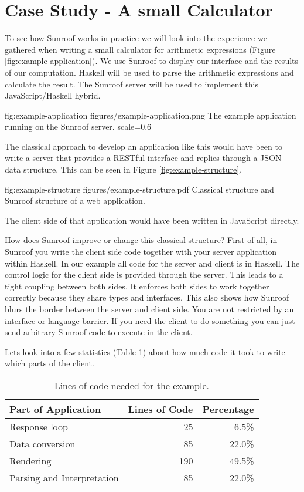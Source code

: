  
\section{Case Study - A small Calculator}
\label{sec:extended-example}

To see how Sunroof works in practice we will look into the 
experience we gathered when writing a small calculator
for arithmetic expressions (Figure \ref{fig:example-application}). 
We use Sunroof to display our interface
and the results of our computation. Haskell will be used to parse the 
arithmetic expressions and calculate the result. The Sunroof server 
will be used to implement this JavaScript/Haskell hybrid.

\FigureS%
{fig:example-application}%
{figures/example-application.png}%
{The example application running on the Sunroof server.}%
{scale=0.6}

The classical approach to develop an application like this would have 
been to write a server that provides a RESTful interface and replies 
through a JSON data structure. This can be seen in Figure 
\ref{fig:example-structure}.

\Figure%
{fig:example-structure}%
{figures/example-structure.pdf}%
{Classical structure and Sunroof structure of a web application.}

The client side of that application would have been written in JavaScript
directly.

How does Sunroof improve or change this classical structure?
First of all, in Sunroof you write the client side code together with
your server application within Haskell. In our example all code 
for the server and client is in Haskell. The control logic 
for the client side is provided through the server.
This leads to a tight coupling between both sides. 
It enforces both sides to work together
correctly because they share types and interfaces. 
This also shows how Sunroof blurs the border between the server 
and client side. You are not restricted by an interface or language 
barrier. If you need the client to do something you can just 
send arbitrary Sunroof code to execute in the client.

Lets look into a few statistics (Table \ref{tab:example-statistics}) 
about how much code it took to write which parts of the client.

\begin{table}
\begin{center}
\begin{tabular}{l@{\quad}rr}
\hline\rule{0pt}{12pt}%
Part of Application & Lines of Code & Percentage \\[2pt]
\hline\rule{0pt}{12pt}%
Response loop & 25 & 6.5\% \\[2pt]
Data conversion & 85 & 22.0\% \\[2pt]
Rendering & 190 & 49.5\% \\[2pt]
Parsing and Interpretation & 85 & 22.0\% \\[2pt]
\hline
\end{tabular}
\end{center}
\caption{Lines of code needed for the example.}
\label{tab:example-statistics}
\end{table} 

